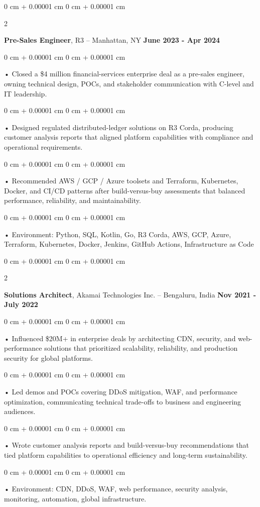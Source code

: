 \documentclass[10pt, letterpaper]{article}
\newenvironment{onecolentry}{
    \begin{adjustwidth}{
        0 cm + 0.00001 cm
    }{
        0 cm + 0.00001 cm
    }
}{
    \end{adjustwidth}
} %
\newenvironment{twocolentry}[2][]{
    \onecolentry
    \def\secondColumn{#2}
    \setcolumnwidth{\fill, 4.5 cm}
    \begin{paracol}{2}
}{
    \switchcolumn \raggedleft \secondColumn
    \end{paracol}
    \endonecolentry
} %
\begin{document}
        \begin{twocolentry}{
            \textbf{June 2023 - Apr 2024}
        }
            \textbf{Pre-Sales Engineer}, R3 -- Manhattan, NY\end{twocolentry}


        \begin{onecolentry}
             • Closed a \$4 million financial-services enterprise deal as a pre-sales engineer, owning technical design, POCs, and stakeholder communication with C-level and IT leadership.
        \end{onecolentry}
        \begin{onecolentry}
             • Designed regulated distributed-ledger solutions on R3 Corda, producing customer analysis reports that aligned platform capabilities with compliance and operational requirements.
        \end{onecolentry}
        \begin{onecolentry}
             • Recommended AWS / GCP / Azure toolsets and Terraform, Kubernetes, Docker, and CI/CD patterns after build-versus-buy assessments that balanced performance, reliability, and maintainability.
        \end{onecolentry}
        \begin{onecolentry}
             • Environment: Python, SQL, Kotlin, Go, R3 Corda, AWS, GCP, Azure, Terraform, Kubernetes, Docker, Jenkins, GitHub Actions, Infrastructure as Code
        \end{onecolentry}
        \vspace{0.1cm}

        \begin{twocolentry}{
            \textbf{Nov 2021 - July 2022}
        }
            \textbf{Solutions Architect}, Akamai Technologies Inc. -- Bengaluru, India \end{twocolentry}
        \begin{onecolentry}
            • Influenced \$20M+ in enterprise deals by architecting CDN, security, and web-performance solutions that prioritized scalability, reliability, and production security for global platforms.
        \end{onecolentry}
        \begin{onecolentry}
            • Led demos and POCs covering DDoS mitigation, WAF, and performance optimization, communicating technical trade-offs to business and engineering audiences.
        \end{onecolentry}
        \begin{onecolentry}
             • Wrote customer analysis reports and build-versus-buy recommendations that tied platform capabilities to operational efficiency and long-term sustainability.
        \end{onecolentry}
        \begin{onecolentry}
             • Environment: CDN, DDoS, WAF, web performance, security analysis, monitoring, automation, global infrastructure.
        \end{onecolentry}
\end{document}
